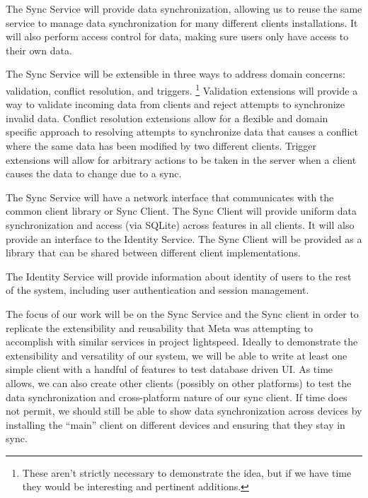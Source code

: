 \documentclass[12pt]{article}
\begin{document}
    The Sync Service will provide data synchronization, allowing us to reuse the same service to manage data synchronization for many different clients installations. It will also perform access control for data, making sure users only have access to their own data.

    The Sync Service will be extensible in three ways to address domain concerns: validation, conflict resolution, and triggers.
        \footnote{These aren't strictly necessary to demonstrate the idea, but if we have time they would be interesting and pertinent additions.}
        Validation extensions will provide a way to validate incoming data from clients and reject attempts to synchronize invalid data.
        Conflict resolution extensions allow for a flexible and domain specific approach to resolving attempts to synchronize data that causes a conflict where the same data has been modified by two different clients.
        Trigger extensions will allow for arbitrary actions to be taken in the server when a client causes the data to change due to a sync.

    The Sync Service will have a network interface that communicates with the common client library or Sync Client. 
    The Sync Client will provide uniform data synchronization and access (via SQLite) across features in all clients.
    It will also provide an interface to the Identity Service.
        The Sync Client will be provided as a library that can be shared between different client implementations.

    The Identity Service will provide information about identity of users to the rest of the system, including user authentication and session management.

    The focus of our work will be on the Sync Service and the Sync client in order to replicate the extensibility and reusability that Meta was attempting to accomplish with similar services in project lightspeed. Ideally to demonstrate the extensibility and versatility of our system, we will be able to write at least one simple client with a handful of features to test database driven UI. As time allows, we can also create other clients (possibly on other platforms) to test the data synchronization and cross-platform nature of our sync client. If time does not permit, we should still be able to show data synchronization across devices by installing the “main” client on different devices and ensuring that they stay in sync.
\end{document}
